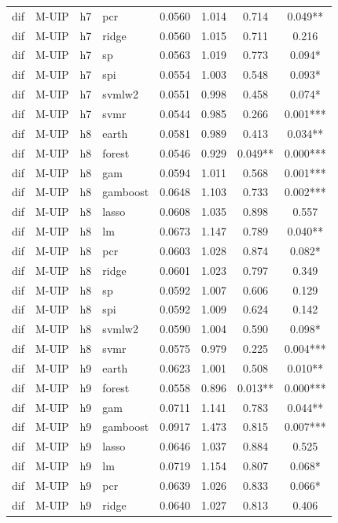 \begin{ThreePartTable}
\begin{longtable}[t]{llclcccc}
dif & M-UIP & h7 & pcr & 0.0560 & 1.014 & 0.714 & 0.049**\\
dif & M-UIP & h7 & ridge & 0.0560 & 1.015 & 0.711 & 0.216\\
dif & M-UIP & h7 & sp & 0.0563 & 1.019 & 0.773 & 0.094*\\
dif & M-UIP & h7 & spi & 0.0554 & 1.003 & 0.548 & 0.093*\\
dif & M-UIP & h7 & svmlw2 & 0.0551 & 0.998 & 0.458 & 0.074*\\
dif & M-UIP & h7 & svmr & 0.0544 & 0.985 & 0.266 & 0.001***\\
\addlinespace
dif & M-UIP & h8 & earth & 0.0581 & 0.989 & 0.413 & 0.034**\\
dif & M-UIP & h8 & forest & 0.0546 & 0.929 & 0.049** & 0.000***\\
dif & M-UIP & h8 & gam & 0.0594 & 1.011 & 0.568 & 0.001***\\
dif & M-UIP & h8 & gamboost & 0.0648 & 1.103 & 0.733 & 0.002***\\
dif & M-UIP & h8 & lasso & 0.0608 & 1.035 & 0.898 & 0.557\\
dif & M-UIP & h8 & lm & 0.0673 & 1.147 & 0.789 & 0.040**\\
dif & M-UIP & h8 & pcr & 0.0603 & 1.028 & 0.874 & 0.082*\\
dif & M-UIP & h8 & ridge & 0.0601 & 1.023 & 0.797 & 0.349\\
dif & M-UIP & h8 & sp & 0.0592 & 1.007 & 0.606 & 0.129\\
dif & M-UIP & h8 & spi & 0.0592 & 1.009 & 0.624 & 0.142\\
dif & M-UIP & h8 & svmlw2 & 0.0590 & 1.004 & 0.590 & 0.098*\\
dif & M-UIP & h8 & svmr & 0.0575 & 0.979 & 0.225 & 0.004***\\
\addlinespace
dif & M-UIP & h9 & earth & 0.0623 & 1.001 & 0.508 & 0.010**\\
dif & M-UIP & h9 & forest & 0.0558 & 0.896 & 0.013** & 0.000***\\
dif & M-UIP & h9 & gam & 0.0711 & 1.141 & 0.783 & 0.044**\\
dif & M-UIP & h9 & gamboost & 0.0917 & 1.473 & 0.815 & 0.007***\\
dif & M-UIP & h9 & lasso & 0.0646 & 1.037 & 0.884 & 0.525\\
dif & M-UIP & h9 & lm & 0.0719 & 1.154 & 0.807 & 0.068*\\
dif & M-UIP & h9 & pcr & 0.0639 & 1.026 & 0.833 & 0.066*\\
dif & M-UIP & h9 & ridge & 0.0640 & 1.027 & 0.813 & 0.406\\

\end{longtable}
\end{ThreePartTable}

